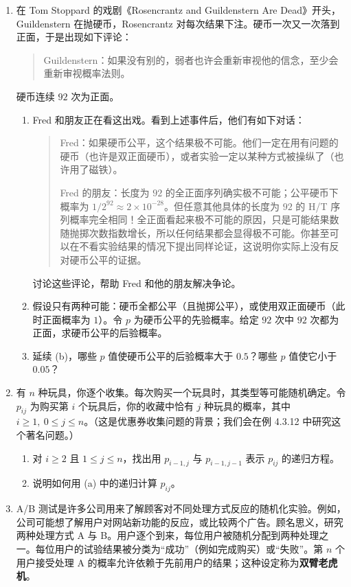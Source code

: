 \documentclass[UTF8,12pt,a4paper,fontset=fandol]{ctexart}
\begin{document}
\begin{enumerate}
  \item 在 Tom Stoppard 的戏剧《Rosencrantz and Guildenstern Are Dead》开头，Guildenstern 在抛硬币，Rosencrantz 对每次结果下注。硬币一次又一次落到正面，于是出现如下评论：
  \begin{quote}
  Guildenstern：如果没有别的，弱者也许会重新审视他的信念，至少会重新审视概率法则。
  \end{quote}
  硬币连续 $92$ 次为正面。
  \begin{enumerate}
    \item Fred 和朋友正在看这出戏。看到上述事件后，他们有如下对话：
    \begin{quote}
    Fred：如果硬币公平，这个结果极不可能。他们一定在用有问题的硬币（也许是双正面硬币），或者实验一定以某种方式被操纵了（也许用了磁铁）。

    Fred 的朋友：长度为 $92$ 的全正面序列确实极不可能；公平硬币下概率为 $1/2^{92}\approx 2\times 10^{-28}$。但任意其他具体的长度为 $92$ 的 H/T 序列概率完全相同！全正面看起来极不可能的原因，只是可能结果数随抛掷次数指数增长，所以任何结果都会显得极不可能。你甚至可以在不看实验结果的情况下提出同样论证，这说明你实际上没有反对硬币公平的证据。
    \end{quote}
    讨论这些评论，帮助 Fred 和他的朋友解决争论。
    \item 假设只有两种可能：硬币全都公平（且抛掷公平），或使用双正面硬币（此时正面概率为 $1$）。令 $p$ 为硬币公平的先验概率。给定 $92$ 次中 $92$ 次都为正面，求硬币公平的后验概率。
    \item 延续 (b)，哪些 $p$ 值使硬币公平的后验概率大于 $0.5$？哪些 $p$ 值使它小于 $0.05$？
  \end{enumerate}

  \item 有 $n$ 种玩具，你逐个收集。每次购买一个玩具时，其类型等可能随机确定。令 $p_{ij}$ 为购买第 $i$ 个玩具后，你的收藏中恰有 $j$ 种玩具的概率，其中 $i\ge 1,\ 0\le j\le n$。（这是优惠券收集问题的背景；我们会在例 4.3.12 中研究这个著名问题。）
  \begin{enumerate}
    \item 对 $i\ge 2$ 且 $1\le j\le n$，找出用 $p_{i-1,j}$ 与 $p_{i-1,j-1}$ 表示 $p_{ij}$ 的递归方程。
    \item 说明如何用 (a) 中的递归计算 $p_{ij}$。
  \end{enumerate}

  \item A/B 测试是许多公司用来了解顾客对不同处理方式反应的随机化实验。例如，公司可能想了解用户对网站新功能的反应，或比较两个广告。顾名思义，研究两种处理方式 A 与 B。用户逐个到来，每位用户被随机分配到两种处理之一。每位用户的试验结果被分类为“成功”（例如完成购买）或“失败”。第 $n$ 个用户接受处理 A 的概率允许依赖于先前用户的结果；这种设定称为\textbf{双臂老虎机}。


\end{enumerate}
\end{document}
